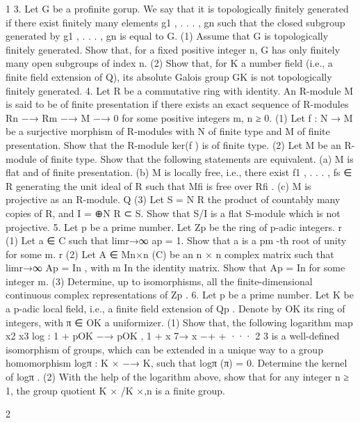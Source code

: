 \documentclass[UTF8,12pt]{ctexart}
\begin{document}
1 3. Let G be a profinite gorup. We say that it is topologically finitely generated if there exist finitely many elements g1 , . . . , gn such that the closed subgroup generated by g1 , . . . , gn is equal to G. (1) Assume that G is topologically finitely generated. Show that, for a fixed positive integer n, G has only finitely many open subgroups of index n. (2) Show that, for K a number field (i.e., a finite field extension of Q), its absolute Galois group GK is not topologically finitely generated. 4. Let R be a commutative ring with identity. An R-module M is said to be of finite presentation if there exists an exact sequence of R-modules Rn −→ Rm −→ M −→ 0 for some positive integers m, n ≥ 0. (1) Let f : N → M be a surjective morphism of R-modules with N of finite type and M of finite presentation. Show that the R-module ker(f ) is of finite type. (2) Let M be an R-module of finite type. Show that the following statements are equivalent. (a) M is flat and of finite presentation. (b) M is locally free, i.e., there exist f1 , . . . , fs ∈ R generating the unit ideal of R such that Mfi is free over Rfi . (c) M is projective as an R-module. Q (3) Let S = N R the product of countably many copies of R, and I = ⊕N R ⊂ S. Show that S/I is a flat S-module which is not projective. 5. Let p be a prime number. Let Zp be the ring of p-adic integers. r (1) Let a ∈ C such that limr→∞ ap = 1. Show that a is a pm -th root of unity for some m. r (2) Let A ∈ Mn×n (C) be an n × n complex matrix such that limr→∞ Ap = In , with m In the identity matrix. Show that Ap = In for some integer m. (3) Determine, up to isomorphisms, all the finite-dimensional continuous complex representations of Zp . 6. Let p be a prime number. Let K be a p-adic local field, i.e., a finite field extension of Qp . Denote by OK its ring of integers, with π ∈ OK a uniformizer. (1) Show that, the following logarithm map x2 x3 log : 1 + pOK −→ pOK , 1 + x 7→ x −+ + ··· 2 3 is a well-defined isomorphism of groups, which can be extended in a unique way to a group homomorphism logπ : K × −→ K, such that logπ (π) = 0. Determine the kernel of logπ . (2) With the help of the logarithm above, show that for any integer n ≥ 1, the group quotient K × /K ×,n is a finite group.

2
\end{document}
